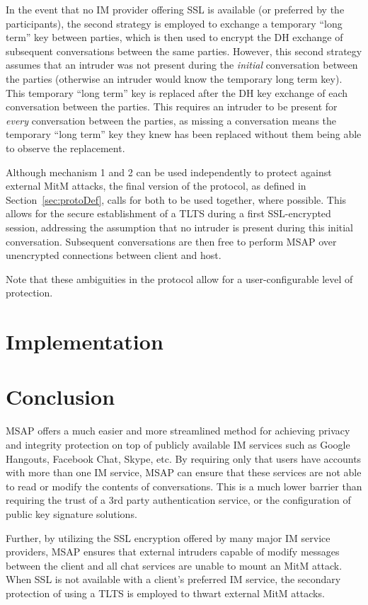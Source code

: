 \documentclass[twoside,10pt]{article}
\begin{document}
\begin{multicols}{2}
In the event that no IM provider offering SSL is available (or preferred by the participants), the second strategy is employed to exchange a temporary ``long term'' key between parties, which is then used to encrypt the DH exchange of subsequent conversations between the same parties.  However, this second strategy assumes that an intruder was not present during the \emph{initial} conversation between the parties (otherwise an intruder would know the temporary long term key).  This temporary ``long term'' key is replaced after the DH key exchange of each conversation between the parties.  This requires an intruder to be  present for \emph{every} conversation between the parties, as missing a conversation means the temporary ``long term'' key they knew has been replaced without them being able to observe the replacement.

Although mechanism 1 and 2 can be used independently to protect against external MitM attacks, the final version of the protocol, as defined in Section~\ref{sec:protoDef}, calls for both to be used together, where possible.  This allows for the secure establishment of a TLTS during a first SSL-encrypted session, addressing the assumption that no intruder is present during this initial conversation.  Subsequent conversations are then free to perform MSAP over unencrypted connections between client and host.

Note that these ambiguities in the protocol allow for a user-configurable level of protection.

\section{Implementation}

\section{Conclusion}
MSAP offers a much easier and more streamlined method for achieving privacy and integrity protection on top of publicly available IM services such as Google Hangouts, Facebook Chat, Skype, etc.  By requiring only that users have accounts with more than one IM service, MSAP can ensure that these services are not able to read or modify the contents of conversations.  This is a much lower barrier than requiring the trust of a 3rd party authentication service, or the configuration of public key signature solutions.

Further, by utilizing the SSL encryption offered by many major IM service providers, MSAP ensures that external intruders capable of modify messages between the client and all chat services are unable to mount an MitM attack.  When SSL is not available with a client's preferred IM service, the secondary protection of using a TLTS is employed to thwart external MitM attacks.


\end{multicols}
\end{document}
